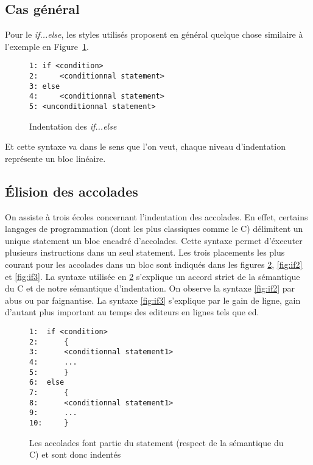 \documentclass{article}
\begin{document}
\subsection{Cas général}
Pour le \emph{if...else}, les styles utilisés proposent en général quelque chose similaire à l'exemple en Figure~\ref{fig:if}.
\begin{figure}
\begin{framed}
\begin{verbatim}
1: if <condition>
2:     <conditionnal statement>
3: else
4:     <conditionnal statement>
5: <unconditionnal statement>
\end{verbatim}
\end{framed}
\caption{Indentation des \emph{if...else}}
\label{fig:if}
\end{figure}
Et cette syntaxe va dans le sens que l'on veut, chaque niveau d'indentation représente un bloc linéaire.

\subsection{Élision des accolades}
On assiste à trois écoles concernant l'indentation des accolades. En effet, certains langages de programmation (dont les plus classiques comme le C) délimitent un unique statement un bloc encadré d'accolades. Cette syntaxe permet d'éxecuter plusieurs instructions dans un seul statement. Les trois placements les plus courant pour les accolades dans un bloc sont indiqués dans les figures \ref{fig:if1}, \ref{fig:if2} et \ref{fig:if3}. La syntaxe utilisée en \ref{fig:if1} s'explique un accord strict de la sémantique du C et de notre sémantique d'indentation. On observe la syntaxe \ref{fig:if2} par abus ou par faignantise. La syntaxe \ref{fig:if3} s'explique par le gain de ligne, gain d'autant plus important au temps des editeurs en lignes tels que ed.

\begin{figure}
\begin{framed}
\begin{verbatim}
1:  if <condition> 
2:      {
3:      <conditionnal statement1>
4:      ...
5:      }
6:  else 
7:      {
8:      <conditionnal statement1>
9:      ...
10:     }
\end{verbatim}
\end{framed}
\caption{Les accolades font partie du statement (respect de la sémantique du C) et sont donc indentés}
\label{fig:if1}
\end{figure}
\end{document}
